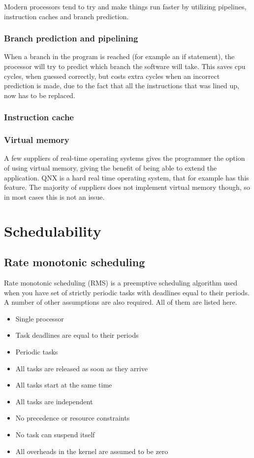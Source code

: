 \documentclass{acm_proc_article-sp}
\begin{document}
Modern processors tend to try and make things run faster by utilizing pipelines, instruction caches and branch prediction.

\subsubsection{Branch prediction and pipelining}
When a branch in the program is reached (for example an if statement), the processor will try to predict which branch the software will take. This saves cpu cycles, when guessed correctly, but costs extra cycles when an incorrect prediction is made, due to the fact that all the instructions that was lined up, now has to be replaced.

\subsubsection{Instruction cache}

\subsubsection{Virtual memory}
A few suppliers of real-time operating systems gives the programmer the option of using virtual memory, giving the benefit of being able to extend the application. QNX is a hard real time operating system, that for example has this feature.
The majority of suppliers does not implement virtual memory though, so in most cases this is not an issue.


\section{Schedulability}
\subsection{Rate monotonic scheduling}
Rate monotonic scheduling (RMS) is a preemptive scheduling algorithm used when you have set of strictly periodic tasks with deadlines equal to their periods. A number of other assumptions are also required. All of them are listed here.
\begin{itemize}
\item Single processor
\item Task deadlines are equal to their periods
\item Periodic tasks
\item All tasks are released as soon as they arrive
\item All tasks start at the same time
\item All tasks are independent
\item No precedence or resource constraints
\item No task can suspend itself
\item All overheads in the kernel are assumed to be zero
\end{itemize}
\end{document}
